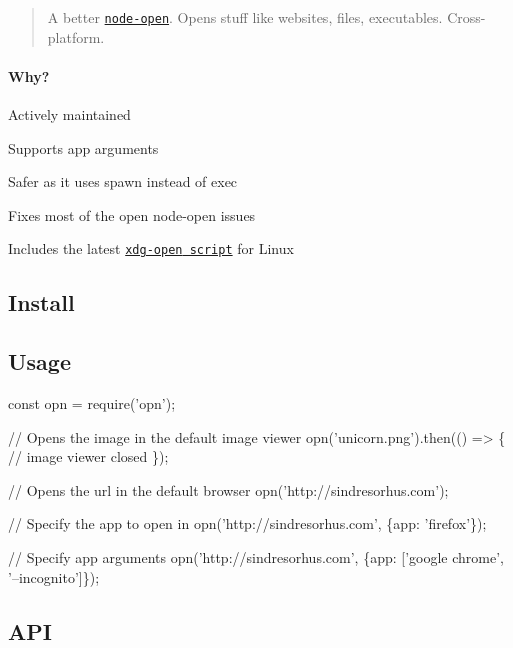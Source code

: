 \begin{quote}
A better \href{https://github.com/pwnall/node-open}{\tt node-\/open}. Opens stuff like websites, files, executables. Cross-\/platform. \end{quote}


\paragraph*{Why?}


\begin{DoxyItemize}
\item Actively maintained
\item Supports app arguments
\item Safer as it uses {\ttfamily spawn} instead of {\ttfamily exec}
\item Fixes most of the open {\ttfamily node-\/open} issues
\item Includes the latest \href{http://cgit.freedesktop.org/xdg/xdg-utils/commit/?id=c55122295c2a480fa721a9614f0e2d42b2949c18}{\tt {\ttfamily xdg-\/open} script} for Linux
\end{DoxyItemize}

\subsection*{Install}




\subsection*{Usage}


\begin{DoxyCode}
const opn = require('opn');

// Opens the image in the default image viewer
opn('unicorn.png').then(() => \{
    // image viewer closed
\});

// Opens the url in the default browser
opn('http://sindresorhus.com');

// Specify the app to open in
opn('http://sindresorhus.com', \{app: 'firefox'\});

// Specify app arguments
opn('http://sindresorhus.com', \{app: ['google chrome', '--incognito']\});
\end{DoxyCode}


\subsection*{A\+PI}

